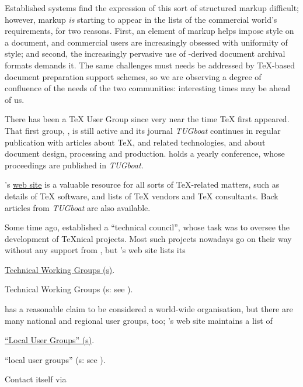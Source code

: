Established \WYSIWYG{} systems find the expression of this sort of
structured markup difficult; however, markup \emph{is} starting to
appear in the lists of the commercial world's requirements, for two
reasons.  First, an element of markup helps impose style on a
document, and commercial users are increasingly obsessed with
uniformity of style; and second, the increasingly pervasive use of
-derived document archival formats demands it.  The same
challenges must needs be addressed by \TeX{}-based document
preparation support schemes, so we are
observing a degree of confluence of the needs of the two communities:
interesting times may be ahead of us.


There has been a \TeX{} User Group since very near the time \TeX{}
first appeared.  That first group, , is still active and its
journal \textsl{TUGboat} continues in regular publication
with articles about \TeX{}, \MF{} and related technologies, and about
document design, processing and production.   holds a yearly
conference, whose proceedings are published in \textsl{TUGboat}.

's \href{http://www.tug.org}{web site} is a valuable
resource for all sorts of
\TeX{}-related matters, such as details of \TeX{} software, and lists
of \TeX{} vendors and \TeX{} consultants.  Back articles from
\textsl{TUGboat} are also available.

Some time ago,  established a ``technical council'', whose
task was to oversee the development of \TeX{}nical projects.  Most
such projects nowadays go on their way without any support from
, but 's web site lists its

\begin{hyperversion}
\href{http://www.tug.org/twg.html}{Technical Working Groups (s)}.
\end{hyperversion}
\begin{flatversion}
Technical Working Groups (s: see
).
\end{flatversion}

 has a reasonable claim to be considered a world-wide
organisation, but there are many national and regional user groups,
too; 's web site maintains a list of
\begin{hyperversion}
\href{http://www.tug.org/lugs.html}{``Local User Groups'' (s)}.
\end{hyperversion}
\begin{flatversion}
``local user groups'' (s: see
).
\end{flatversion}

Contact  itself via 
